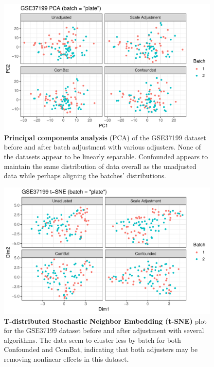 \documentclass[11pt]{article}
\begin{document}
\begin{figure}
	\centering
	\includegraphics[width=\columnwidth]{figures/final/pca.pdf}
	\caption[Principal components analysis (PCA)]{\textbf{Principal components analysis} (PCA) of the GSE37199 dataset before and after batch adjustment with various adjusters.
	None of the datasets appear to be linearly separable.
	Confounded appears to maintain the same distribution of data overall as the unadjusted data while perhaps aligning the batches' distributions.}
	\label{fig:pca}
\end{figure}
\begin{figure}
	\centering
	\includegraphics[width=\columnwidth]{figures/final/tsne.pdf}
	\caption[T-distributed Stochastic Neighbor Embedding (t-SNE)]{\textbf{T-distributed Stochastic Neighbor Embedding (t-SNE)} plot for the GSE37199 dataset before and after adjustment with several algorithms.
	The data seem to cluster less by batch for both Confounded and ComBat, indicating that both adjusters may be removing nonlinear effects in this dataset.}
	\label{fig:tsne}
\end{figure}
\end{document}
